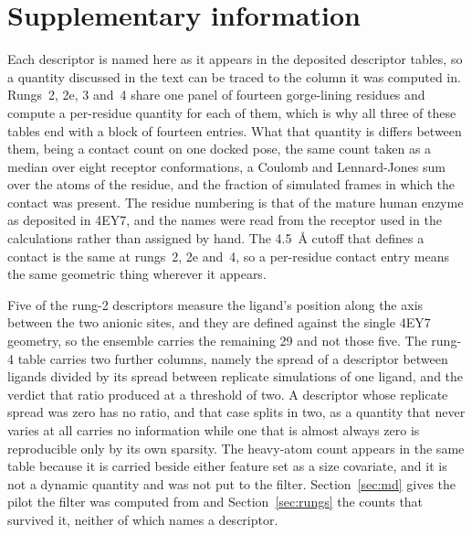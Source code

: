 \clearpage
\appendix
\section*{Supplementary information}
\renewcommand{\thetable}{S\arabic{table}}
\setcounter{table}{0}

Each descriptor is named here as it appears in the deposited descriptor tables, so a
quantity discussed in the text can be traced to the column it was computed in.
Rungs~2, 2e, 3 and~4 share one panel of fourteen gorge-lining residues and compute a
per-residue quantity for each of them, which is why all three of these tables end with
a block of fourteen entries. What that quantity is differs between them, being a
contact count on one docked pose, the same count taken as a median over eight receptor
conformations, a Coulomb and Lennard-Jones sum over the atoms of the residue, and the
fraction of simulated frames in which the contact was present. The residue numbering is
that of the mature human enzyme as deposited in 4EY7, and the names were read from the
receptor used in the calculations rather than assigned by hand. The
\SI{4.5}{\angstrom} cutoff that defines a contact is the same at rungs~2, 2e and~4, so
a per-residue contact entry means the same geometric thing wherever it appears.

Five of the rung-2 descriptors measure the ligand's position along the axis between the
two anionic sites, and they are defined against the single 4EY7 geometry, so the
ensemble carries the remaining 29 and not those five. The rung-4 table carries two
further columns, namely the spread of a descriptor between ligands divided by its spread
between replicate simulations of one ligand, and the verdict that ratio produced at a
threshold of two. A descriptor whose replicate spread was zero has no ratio, and that
case splits in two, as a quantity that never varies at all carries no information while
one that is almost always zero is reproducible only by its own sparsity. The heavy-atom
count appears in the same table because it is carried beside either feature set as a
size covariate, and it is not a dynamic quantity and was not put to the filter.
Section~\ref{sec:md} gives the pilot the filter was computed from and
Section~\ref{sec:rungs} the counts that survived it, neither of which names a
descriptor.

\begin{table}[htbp]
  \centering
  \footnotesize
  \caption{\textbf{Rung~2 and rung~2e descriptors.} The 34 geometric descriptors
    measured on the docked pose, with the 29 of them that the receptor ensemble carries
    over to rung~2e.}
  \label{tab:sirung2}
  
\end{table}

